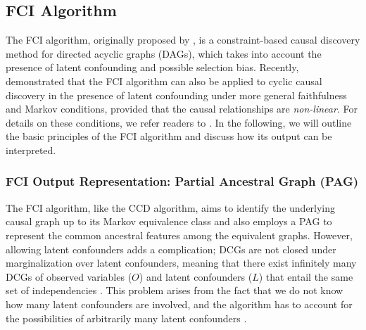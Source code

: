 \documentclass[twoside, 11pt]{article}
\begin{document}
\subsection{FCI Algorithm}
The FCI algorithm, originally proposed by \cite{spirtes2000}, is a constraint-based causal discovery method for directed acyclic graphs (DAGs), which takes into account the presence of latent confounding and possible selection bias. Recently, \citet{mooij_classen2020} demonstrated that the FCI algorithm can also be applied to cyclic causal discovery in the presence of latent confounding under more general faithfulness and Markov conditions, provided that the causal relationships are \textit{non-linear}. For details on these conditions, we refer readers to \citet{forre_markov_2017}. In the following, we will outline the basic principles of the FCI algorithm and discuss how its output can be interpreted.



\subsubsection{FCI Output Representation: Partial Ancestral Graph (PAG)}\label{fcipag}
The FCI algorithm, like the CCD algorithm, aims to identify the underlying causal graph up to its Markov equivalence class and also employs a PAG to represent the common ancestral features among the equivalent graphs.
However, allowing latent confounders adds a complication; DCGs are not closed under marginalization over latent confounders, meaning that there exist infinitely many DCGs of observed variables ($O$) and latent confounders ($L$) that entail the same set of independencies \citep{Richardson2002}. This problem arises from the fact that we do not know how many latent confounders are involved, and the algorithm has to account for the possibilities of arbitrarily many latent confounders \citep{zhang_characterization_2005}. 
\end{document}
